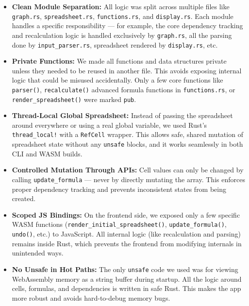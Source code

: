 \documentclass[12pt]{article}
\begin{document}
    \begin{itemize}

        \item \textbf{Clean Module Separation:}
        All logic was split across multiple files like \texttt{graph.rs}, \texttt{spreadsheet.rs}, \texttt{functions.rs}, and \texttt{display.rs}. Each module handles a specific responsibility — for example, the core dependency tracking and recalculation logic is handled exclusively by \texttt{graph.rs}, all the parsing done by \texttt{input\_parser.rs}, spreadsheet rendered by \texttt{display.rs}, etc.

        \item \textbf{Private Functions:}
        We made all functions and data structures private unless they needed to be reused in another file. This avoids exposing internal logic that could be misused accidentally. Only a few core functions like \texttt{parser()}, \texttt{recalculate()} advanced formula functions in \texttt{functions.rs}, or \texttt{render\_spreadsheet()} were marked \texttt{pub}.

        \item \textbf{Thread-Local Global Spreadsheet:}
        Instead of passing the spreadsheet around everywhere or using a real global variable, we used Rust’s \texttt{thread\_local!} with a \texttt{RefCell} wrapper. This allows safe, shared mutation of spreadsheet state without any \texttt{unsafe} blocks, and it works seamlessly in both CLI and WASM builds.

        \item \textbf{Controlled Mutation Through APIs:}
        Cell values can only be changed by calling \texttt{update\_formula} — never by directly mutating the array. This enforces proper dependency tracking and prevents inconsistent states from being created.

        \item \textbf{Scoped JS Bindings:}
        On the frontend side, we exposed only a few specific WASM functions (\texttt{render\_initial\_spreadsheet()}, \texttt{update\_formula()}, \texttt{undo()}, etc.) to JavaScript. All internal logic (like recalculation and parsing) remains inside Rust, which prevents the frontend from modifying internals in unintended ways.

        \item \textbf{No Unsafe in Hot Paths:}
        The only \texttt{unsafe} code we used was for viewing WebAssembly memory as a string buffer during startup. All the logic around cells, formulas, and dependencies is written in safe Rust. This makes the app more robust and avoids hard-to-debug memory bugs.
        \\
    \end{itemize}
\end{document}
